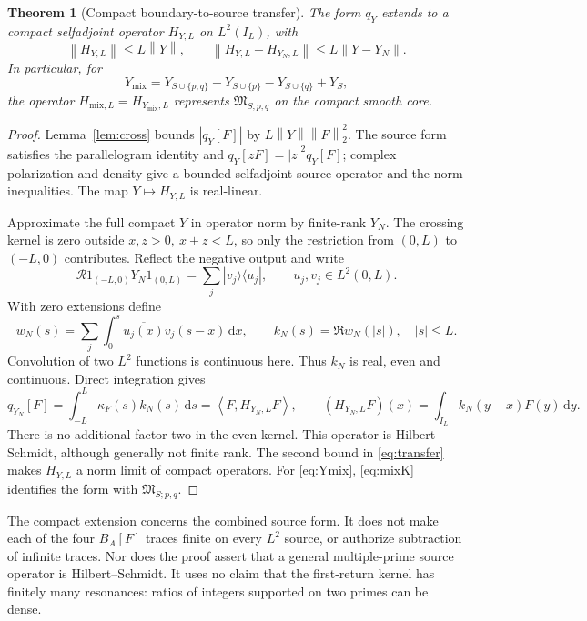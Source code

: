 \documentclass[11pt]{article}
\newtheorem{theorem}{Theorem}[section]
\theoremstyle{remark}
\newcommand{\Mix}{\mathfrak M_{S;p,q}}
\newcommand{\norm}[1]{\left\lVert#1\right\rVert}
\newcommand{\ip}[2]{\left\langle#1,#2\right\rangle}
\newcommand{\dd}{\,\mathrm d}
\numberwithin{equation}{section}
\begin{document}
\begin{theorem}[Compact boundary-to-source transfer]\label{thm:transfer}
The form \(q_Y\) extends to a compact selfadjoint operator \(H_{Y,L}\)
on \(L^2(I_L)\), with
\begin{equation}\label{eq:transfer}
 \norm{H_{Y,L}}\le L\norm Y,\qquad
 \norm{H_{Y,L}-H_{Y_N,L}}\le L\norm{Y-Y_N}.
\end{equation}
In particular, for
\begin{equation}\label{eq:Ymix}
 Y_{\mathrm{mix}}=Y_{S\cup\{p,q\}}-Y_{S\cup\{p\}}
                  -Y_{S\cup\{q\}}+Y_S ,
\end{equation}
the operator \(H_{\mathrm{mix},L}=H_{Y_{\mathrm{mix}},L}\) represents
\(\Mix\) on the compact smooth core.
\end{theorem}
\begin{proof}
Lemma~\ref{lem:cross} bounds \(|q_Y[F]|\) by
\(L\norm Y\norm F_2^2\). The source form satisfies the parallelogram
identity and \(q_Y[zF]=|z|^2q_Y[F]\); complex polarization and density
give a bounded selfadjoint source operator and the norm inequalities.
The map \(Y\mapsto H_{Y,L}\) is real-linear.

Approximate the full compact \(Y\) in operator norm by finite-rank \(Y_N\).
The crossing kernel is zero outside \(x,z>0,\ x+z<L\), so only the
restriction from \((0,L)\) to \((-L,0)\) contributes. Reflect the negative
output and write
\[
 \mathscr R1_{(-L,0)}Y_N1_{(0,L)}
       =\sum_j|v_j\rangle\langle u_j|,\qquad u_j,v_j\in L^2(0,L).
\]
With zero extensions define
\begin{equation}\label{eq:wkernel}
 w_N(s)=\sum_j\int_0^s\overline{u_j(x)}v_j(s-x)\dd x,\qquad
 k_N(s)=\Re w_N(|s|),\quad |s|\le L .
\end{equation}
Convolution of two \(L^2\) functions is continuous here. Thus \(k_N\)
is real, even and continuous. Direct integration gives
\begin{equation}\label{eq:sourcekernel}
 q_{Y_N}[F]=\int_{-L}^L\kappa_F(s)k_N(s)\dd s
  =\ip F{H_{Y_N,L}F},\qquad
 (H_{Y_N,L}F)(x)=\int_{I_L}k_N(y-x)F(y)\dd y .
\end{equation}
There is no additional factor two in the even kernel. This operator is
Hilbert--Schmidt, although generally not finite rank. The second bound
in \eqref{eq:transfer} makes \(H_{Y,L}\) a norm limit of compact operators.
For \eqref{eq:Ymix}, \eqref{eq:mixK} identifies the form with \(\Mix\).
\end{proof}

The compact extension concerns the combined source form. It does not
make each of the four \(B_A[F]\) traces finite on every \(L^2\) source,
or authorize subtraction of infinite traces. Nor does the proof assert
that a general multiple-prime source operator is Hilbert--Schmidt. It
uses no claim that the first-return kernel has finitely many resonances:
ratios of integers supported on two primes can be dense.
\end{document}
